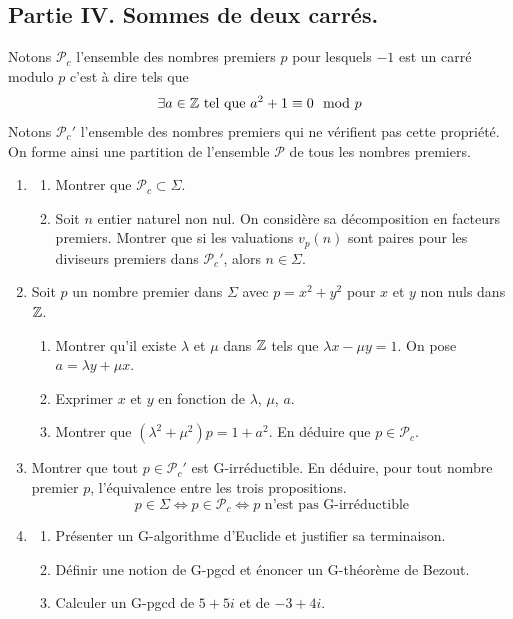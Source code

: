 \subsection*{Partie IV. Sommes de deux carrés.}
Notons $\mathcal{P}_c$ l'ensemble des nombres premiers $p$ pour lesquels $-1$ est un carré modulo $p$ c'est à dire tels que 
\begin{displaymath}
  \exists a\in \mathbb{Z} \text{ tel que } a^2 + 1 \equiv 0 \mod p
\end{displaymath}
Notons $\mathcal{P}_c'$ l'ensemble des nombres premiers qui ne vérifient pas cette propriété. On forme ainsi une partition de l'ensemble $\mathcal{P}$ de tous les nombres premiers.
\begin{enumerate}	
  \item
\begin{enumerate}
  \item Montrer que $\mathcal{P}_c \subset \Sigma$.
  \item Soit $n$ entier naturel non nul. On considère sa décomposition en facteurs premiers. Montrer que si les valuations $v_p(n)$ sont paires pour les diviseurs premiers dans $\mathcal{P}_c'$, alors $n\in \Sigma$.
\end{enumerate}
\item Soit $p$ un nombre premier dans $\Sigma$ avec $p=x^2+y^2$ pour $x$ et $y$ non nuls dans $\mathbb{Z}$.
\begin{enumerate}
  \item Montrer qu'il existe $\lambda$ et $\mu$ dans $\mathbb{Z}$ tels que $\lambda x - \mu y = 1$. On pose $a = \lambda y + \mu x$.
  \item Exprimer $x$ et $y$ en fonction de $\lambda$, $\mu$, $a$.
  \item Montrer que $(\lambda^2 + \mu^2)p = 1 +a^2$. En déduire que $p\in \mathcal{P}_c$.
\end{enumerate}

\item Montrer que tout $p \in \mathcal{P}_c'$ est G-irréductible. En déduire, pour tout nombre premier $p$, l'équivalence entre les trois propositions.
\begin{displaymath}
  p\in \Sigma \Leftrightarrow p\in \mathcal{P}_c \Leftrightarrow p \text{ n'est pas G-irréductible}
\end{displaymath}

\item
\begin{enumerate}
  \item Présenter un G-algorithme d'Euclide et justifier sa terminaison.
  \item Définir une notion de G-pgcd et énoncer un G-théorème de Bezout.
  \item Calculer un G-pgcd de $5+5i$ et de $-3+4i$.
\end{enumerate}


\end{enumerate}
